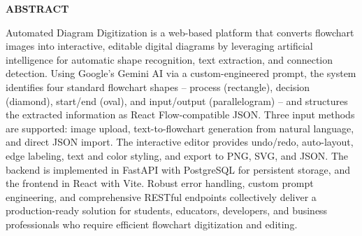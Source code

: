 \clearpage
{}
{}
\thispagestyle{footeronly}
\begin{center}
{\Large \textbf{ABSTRACT}}
\end{center}

Automated Diagram Digitization is a web-based platform that converts flowchart images into interactive, editable digital diagrams by leveraging artificial intelligence for automatic shape recognition, text extraction, and connection detection. Using Google's Gemini AI via a custom-engineered prompt, the system identifies four standard flowchart shapes -- process (rectangle), decision (diamond), start/end (oval), and input/output (parallelogram) -- and structures the extracted information as React Flow-compatible JSON. Three input methods are supported: image upload, text-to-flowchart generation from natural language, and direct JSON import. The interactive editor provides undo/redo, auto-layout, edge labeling, text and color styling, and export to PNG, SVG, and JSON. The backend is implemented in FastAPI with PostgreSQL for persistent storage, and the frontend in React with Vite. Robust error handling, custom prompt engineering, and comprehensive RESTful endpoints collectively deliver a production-ready solution for students, educators, developers, and business professionals who require efficient flowchart digitization and editing.
